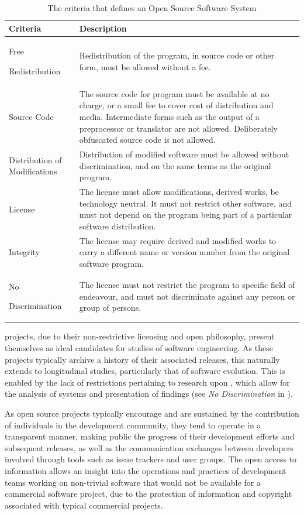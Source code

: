 \begin{table}[t]
\centering
\begin{tabular}{|p{}|p{}|}
\hline
{\bf Criteria}&{\bf Description} \\
\hline
\hline
Free \par Redistribution & Redistribution of the program, in source code or other form, must be allowed without a fee. \\
\hline
Source Code & The source code for program must be available at no charge, or a small fee to cover cost of distribution and media. Intermediate forms such as the output of a preprocessor or translator are not allowed. Deliberately obfuscated source code is not allowed. \\
\hline
Distribution of Modifications & Distribution of modified software must be allowed without discrimination, and on the same terms as the original program. \\ 
\hline
License & The license must allow modifications, derived works, be technology neutral. It must not restrict other software, and must not depend on the program being part of a particular software distribution. \\
\hline
Integrity & The license may require derived and modified works to carry a different name or version number from the original software program.  \\
\hline
No \par Discrimination & The license must not restrict the program to specific field of endeavour, and must not discriminate against any person or group of persons. \\
\hline
\end{tabular}
\vspace{0.2cm}
\caption{The criteria that defines an Open Source Software System}
\label{tab:osi_criteria}
\end{table}

{\OSS} projects, due to their non-restrictive licensing and open philosophy, present themselves as ideal candidates for studies of software engineering. As these projects typically archive a history of their associated releases, this naturally extends to longitudinal studies, particularly that of software evolution. This is enabled by the lack of restrictions pertaining to research upon \OSYS, which allow for the analysis of systems and presentation of findings (see \emph{No Discrimination} in ).

As open source projects typically encourage and are sustained by the contribution of individuals in the development community, they tend to operate in a transparent manner, making public the progress of their development efforts and subsequent releases, as well as the communication exchanges between developers involved through tools such as issue trackers and user groups. The open access to information allows an insight into the operations and practices of development teams working on non-trivial software that would not be available for a commercial software project, due to the protection of information and copyright associated with typical commercial projects.

